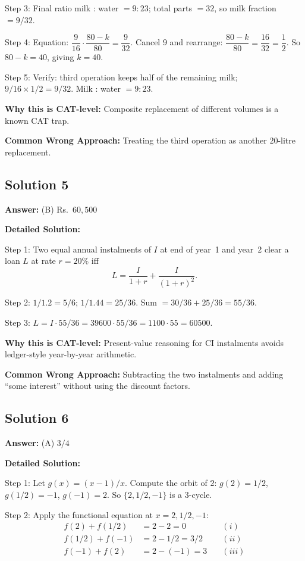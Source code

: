 \documentclass[11pt]{article}
\begin{document}
Step 3: Final ratio milk : water \(= 9:23\); total parts \(=32\), so milk fraction \(=9/32\).

Step 4: Equation: \(\dfrac{9}{16}\cdot\dfrac{80-k}{80} = \dfrac{9}{32}\). Cancel 9 and rearrange:
\(\dfrac{80-k}{80} = \dfrac{16}{32} = \dfrac{1}{2}\). So \(80 - k = 40\), giving \(k = 40\).

Step 5: Verify: third operation keeps half of the remaining milk; \(9/16 \times 1/2 = 9/32\). Milk : water \(= 9 : 23\). \checkmark

\textbf{Why this is CAT-level:} Composite replacement of different volumes is a known CAT trap.

\textbf{Common Wrong Approach:} Treating the third operation as another \(20\)-litre replacement.

\subsection*{Solution 5}

\textbf{Answer:} (B) Rs.~\(60{,}500\)

\textbf{Detailed Solution:}

Step 1: Two equal annual instalments of \(I\) at end of year~1 and year~2 clear a loan \(L\) at rate \(r=20\%\) iff
\[
L = \frac{I}{1+r} + \frac{I}{(1+r)^2}.
\]

Step 2: \(1/1.2 = 5/6\); \(1/1.44 = 25/36\). Sum \(=30/36 + 25/36 = 55/36\).

Step 3: \(L = I\cdot 55/36 = 39600 \cdot 55/36 = 1100 \cdot 55 = 60500\).

\textbf{Why this is CAT-level:} Present-value reasoning for CI instalments avoids ledger-style year-by-year arithmetic.

\textbf{Common Wrong Approach:} Subtracting the two instalments and adding ``some interest'' without using the discount factors.

\subsection*{Solution 6}

\textbf{Answer:} (A) \(3/4\)

\textbf{Detailed Solution:}

Step 1: Let \(g(x) = (x-1)/x\). Compute the orbit of \(2\): \(g(2) = 1/2\), \(g(1/2) = -1\), \(g(-1) = 2\). So \(\{2, 1/2, -1\}\) is a 3-cycle.

Step 2: Apply the functional equation at \(x=2, 1/2, -1\):
\begin{align*}
f(2) + f(1/2) &= 2 - 2 = 0 \quad &(i)\\
f(1/2) + f(-1) &= 2 - 1/2 = 3/2 \quad &(ii)\\
f(-1) + f(2) &= 2 - (-1) = 3 \quad &(iii)
\end{align*}
\end{document}
